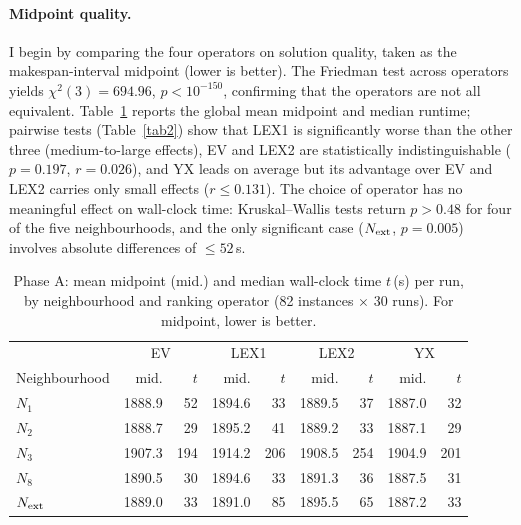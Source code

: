 \documentclass[preprint,12pt]{elsarticle}
\begin{document}
\paragraph{Midpoint quality.} I begin by comparing the four operators on solution quality, taken as the makespan-interval midpoint (lower is better). The Friedman test across operators yields $\chi^{2}(3) = 694.96$, $p < 10^{-150}$, confirming that the operators are not all equivalent. Table~\ref{tab1} reports the global mean midpoint and median runtime; pairwise tests (Table~\ref{tab2}) show that LEX1 is significantly worse than the other three (medium-to-large effects), EV and LEX2 are statistically indistinguishable ($p = 0.197$, $r = 0.026$), and YX leads on average but its advantage over EV and LEX2 carries only small effects ($r \leq 0.131$). The choice of operator has no meaningful effect on wall-clock time: Kruskal--Wallis tests return $p > 0.48$ for four of the five neighbourhoods, and the only significant case ($N_{\rm ext}$, $p = 0.005$) involves absolute differences of $\leq 52$\,s.

\begin{table}[t]
\centering
\caption{Phase A: mean midpoint (mid.) and median wall-clock time $t$\,(s) per run, by neighbourhood and ranking operator (82 instances $\times$ 30 runs). For midpoint, lower is better.}
\label{tab1}
\small
\begin{tabular}{l rr rr rr rr}
\hline
 & \multicolumn{2}{c}{EV} & \multicolumn{2}{c}{LEX1} & \multicolumn{2}{c}{LEX2} & \multicolumn{2}{c}{YX} \\
Neighbourhood & mid. & $t$ & mid. & $t$ & mid. & $t$ & mid. & $t$ \\
\hline
$N_1$         & 1888.9 &  52 & 1894.6 &  33 & 1889.5 &  37 & 1887.0 &  32 \\
$N_2$         & 1888.7 &  29 & 1895.2 &  41 & 1889.2 &  33 & 1887.1 &  29 \\
$N_3$         & 1907.3 & 194 & 1914.2 & 206 & 1908.5 & 254 & 1904.9 & 201 \\
$N_8$         & 1890.5 &  30 & 1894.6 &  33 & 1891.3 &  36 & 1887.5 &  31 \\
$N_{\rm ext}$ & 1889.0 &  33 & 1891.0 &  85 & 1895.5 &  65 & 1887.2 &  33 \\
\hline
\end{tabular}
\end{table}
\end{document}
